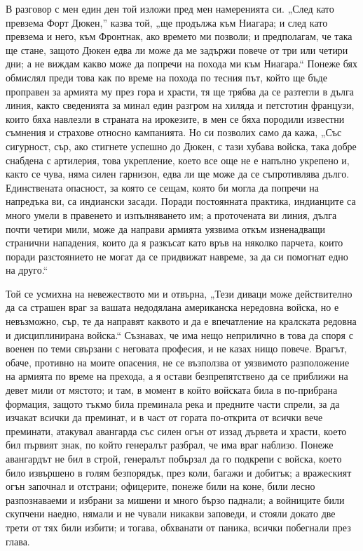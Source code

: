 \documentclass[12pt]{book}
\begin{document}
В разговор с мен един ден той изложи пред мен намеренията си. „След като превзема Форт Дюкен,” казва той, „ще продължа към Ниагара; и след като превзема и него, към Фронтнак, ако времето ми позволи; и предполагам, че така ще стане, защото Дюкен едва ли може да ме задържи повече от три или четири дни; а не виждам какво може да попречи на похода ми към Ниагара.“ Понеже бях обмислял преди това как по време на похода по тесния път, който ще бъде проправен за армията му през гора и храсти, тя ще трябва да се разтегли в дълга линия, както сведенията за минал един разгром на хиляда и петстотин французи, които бяха навлезли в страната на ирокезите, в мен се бяха породили известни съмнения и страхове относно кампанията. Но си позволих само да кажа, „Със сигурност, сър, ако стигнете успешно до Дюкен, с тази хубава войска, така добре снабдена с артилерия, това укрепление, което все още не е напълно укрепено и, както се чува, няма силен гарнизон, едва ли ще може да се съпротивлява дълго. Единствената опасност, за която се сещам, която би могла да попречи на напредъка ви, са индиански засади. Поради постоянната практика, индианците са много умели в правенето и изпълняването им; а проточената ви линия, дълга почти четири мили, може да направи армията уязвима откъм изненадващи странични нападения, които да я разкъсат като връв на няколко парчета, които поради разстоянието не могат да се придвижат навреме, за да си помогнат едно на друго.“


Той се усмихна на невежеството ми и отвърна, „Тези диваци може действително да са страшен враг за вашата недодялана американска нередовна войска, но е невъзможно, сър, те да направят каквото и да е впечатление на кралската редовна и дисциплинирана войска.“ Съзнавах, че има нещо неприлично в това да споря с военен по теми свързани с неговата професия, и не казах нищо повече. Врагът, обаче, противно на моите опасения, не се възползва от уязвимото разположение на армията по време на прехода, а я остави безпрепятствено да се приближи на девет мили от мястото; и там, в момент в който войската била в по-прибрана формация, защото тъкмо била преминала река и предните части спрели, за да изчакат всички да преминат, и в част от гората по-открита от всички вече преминати, атакувал авангарда със силен огън от иззад дървета и храсти, което бил първият знак, по който генералът разбрал, че има враг наблизо. Понеже авангардът не бил в строй, генералът побързал да го подкрепи с войска, което било извършено в голям безпорядък, през коли, багажи и добитък; а вражеският огън започнал и отстрани; офицерите, понеже били на коне, били лесно разпознаваеми и избрани за мишени и много бързо паднали; а войниците били скупчени наедно, нямали и не чували никакви заповеди, и стояли докато две трети от тях били избити; и тогава, обхванати от паника, всички побегнали през глава.
\end{document}
